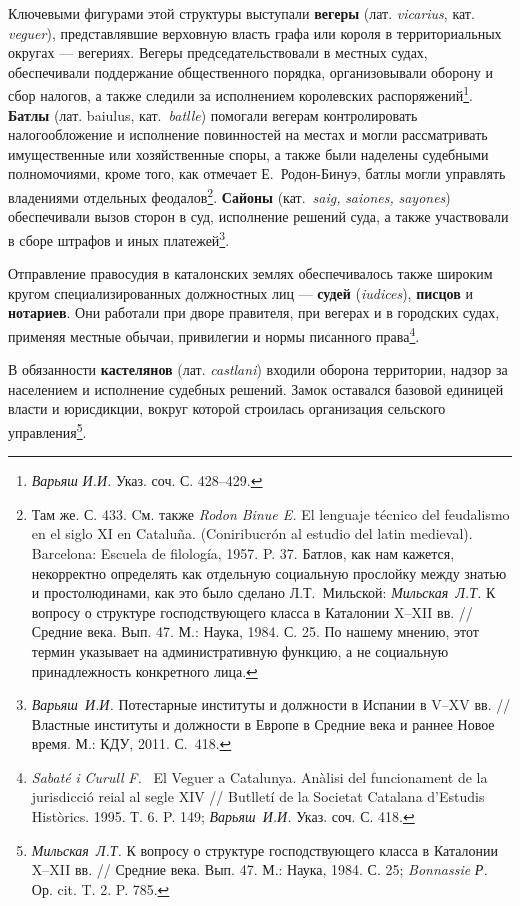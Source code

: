 Ключевыми фигурами этой структуры выступали \textbf{вегеры} (лат. \emph{vicarius}, кат. \emph{veguer}), представлявшие верховную власть графа или короля в территориальных округах --- вегериях. Вегеры председательствовали в местных судах, обеспечивали поддержание общественного порядка, организовывали оборону и сбор налогов, а также следили за исполнением королевских распоряжений\footnote{\emph{Варьяш}\emph{ И.И.} Указ. соч. С. 428--429.}. \textbf{Батлы}\textbf{ }(лат. baiulus, кат.~\emph{batlle}) помогали вегерам контролировать налогообложение и исполнение повинностей на местах и могли рассматривать имущественные или хозяйственные споры, а также были наделены судебными полномочиями, кроме того, как отмечает Е.~Родон-Бинуэ, батлы могли управлять владениями отдельных феодалов\footnote{Там же. С. 433. Cм. также \emph{Rodon Binue E.} El lenguaje técnico del feudalismo en el siglo XI en Cataluña. (Coniribucrón al estudio del latin medieval). Barcelona: Escuela de filología, 1957. P. 37. Батлов, как нам кажется, некорректно определять как отдельную социальную прослойку между знатью и простолюдинами, как это было сделано Л.Т.~Мильской: \emph{Мильская}\emph{~Л.Т.} К вопросу о структуре господствующего класса в Каталонии X--XII вв. // Средние века. Вып. 47. М.: Наука, 1984. С. 25. По нашему мнению, этот термин указывает на административную функцию, а не социальную принадлежность конкретного лица.}. \textbf{С}\textbf{айоны}\textbf{ }(кат.~\emph{saig}\emph{,} \emph{saiones}\emph{, }\emph{sayones}) обеспечивали вызов сторон в суд, исполнение решений суда, а также участвовали в сборе штрафов и иных платежей\footnote{\emph{Варьяш}\emph{~И.И.} Потестарные институты и должности в Испании в V--XV вв. // Властные институты и должности в Европе в Средние века и раннее Новое время. М.: КДУ, 2011. С.~418.}.

Отправление правосудия в каталонских землях обеспечивалось также широким кругом специализированных должностных лиц --- \textbf{судей} (\emph{iudices}), \textbf{писцов} и \textbf{нотариев}. Они работали при дворе правителя, при вегерах и в городских судах, применяя местные обычаи, привилегии и нормы писанного права\footnote{\emph{Sabat}\emph{é }\emph{i}\emph{ }\emph{Curull}\emph{ }\emph{F}\emph{.} ~El Veguer a Catalunya. Anàlisi del funcionament de la jurisdicció reial al segle XIV // Butlletí de la Societat Catalana d’Estudis Històrics. 1995. Т. 6. P. 149;\emph{ }\emph{Варьяш}\emph{~}\emph{И.И.} Указ. соч. С. 418.}.

В обязанности \textbf{кастелянов} (лат. \emph{castlani}) входили оборона территории, надзор за населением и исполнение судебных решений. Замок оставался базовой единицей власти и юрисдикции, вокруг которой строилась организация сельского управления\footnote{\emph{Мильская}\emph{~Л.Т.} К вопросу о структуре господствующего класса в Каталонии X--XII вв. // Средние века. Вып. 47. М.: Наука, 1984. С. 25; \emph{Bonnassie}\emph{ Р. }Ор. cit. T. 2. P. 785.}.

